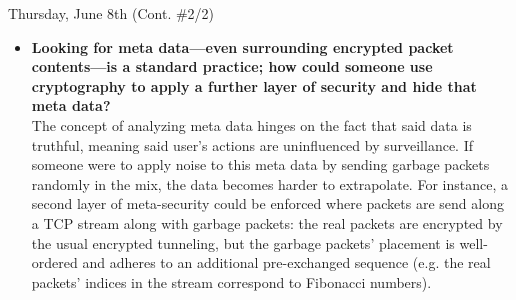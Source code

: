 \documentclass[11pt]{article}
\begin{document}
\begin{orangebox}{Thursday, June 8th (Cont. \#2/2)\vspace{-2em}\begin{flushright}\end{flushright}}
\begin{itemize}
    \item\textbf{Looking for meta data---even surrounding encrypted packet contents---is a standard practice; how could someone use cryptography to apply a further layer of security and hide that meta data?} \\
    \phantom{~~~~} The concept of analyzing meta data hinges on the fact that said data is truthful, meaning said user's actions are uninfluenced by surveillance. If someone were to apply noise to this meta data by sending garbage packets randomly in the mix, the data becomes harder to extrapolate. For instance, a second layer of meta-security could be enforced where packets are send along a TCP stream along with garbage packets: the real packets are encrypted by the usual encrypted tunneling, but the garbage packets' placement is well-ordered and adheres to an additional pre-exchanged sequence (e.g. the real packets' indices in the stream correspond to Fibonacci numbers).
\end{itemize}
\end{orangebox}

\begin{center}
\vspace{-0.25em}
\hspace{0.2cm}
\vspace{-0.4em}
\end{center}
\end{document}

